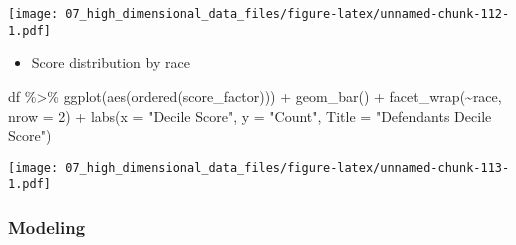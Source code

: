 \documentclass[
]{book}
\newenvironment{Shaded}{\begin{snugshade}}{\end{snugshade}}
\newcommand{\AttributeTok}[1]{\textcolor[rgb]{0.77,0.63,0.00}{#1}}
\newcommand{\DecValTok}[1]{\textcolor[rgb]{0.00,0.00,0.81}{#1}}
\newcommand{\FunctionTok}[1]{\textcolor[rgb]{0.00,0.00,0.00}{#1}}
\newcommand{\NormalTok}[1]{#1}
\newcommand{\SpecialCharTok}[1]{\textcolor[rgb]{0.00,0.00,0.00}{#1}}
\newcommand{\StringTok}[1]{\textcolor[rgb]{0.31,0.60,0.02}{#1}}
\providecommand{\tightlist}{%
  \setlength{\itemsep}{0pt}\setlength{\parskip}{0pt}}
\begin{document}
\texttt{[image: 07\_high\_dimensional\_data\_files/figure-latex/unnamed-chunk-112-1.pdf]}

\begin{itemize}
\tightlist
\item
  Score distribution by race
\end{itemize}

\begin{Shaded}
\begin{Highlighting}[]
\NormalTok{df }\SpecialCharTok{\%\textgreater{}\%}
  \FunctionTok{ggplot}\NormalTok{(}\FunctionTok{aes}\NormalTok{(}\FunctionTok{ordered}\NormalTok{(score\_factor))) }\SpecialCharTok{+} 
          \FunctionTok{geom\_bar}\NormalTok{() }\SpecialCharTok{+}
          \FunctionTok{facet\_wrap}\NormalTok{(}\SpecialCharTok{\textasciitilde{}}\NormalTok{race, }\AttributeTok{nrow =} \DecValTok{2}\NormalTok{) }\SpecialCharTok{+}
          \FunctionTok{labs}\NormalTok{(}\AttributeTok{x =} \StringTok{"Decile Score"}\NormalTok{,}
               \AttributeTok{y =} \StringTok{"Count"}\NormalTok{,}
               \AttributeTok{Title =} \StringTok{"Defendant\textquotesingle{}s Decile Score"}\NormalTok{)}
\end{Highlighting}
\end{Shaded}

\texttt{[image: 07\_high\_dimensional\_data\_files/figure-latex/unnamed-chunk-113-1.pdf]}

\hypertarget{modeling-1}{%
\subsubsection{Modeling}\label{modeling-1}}
\end{document}
